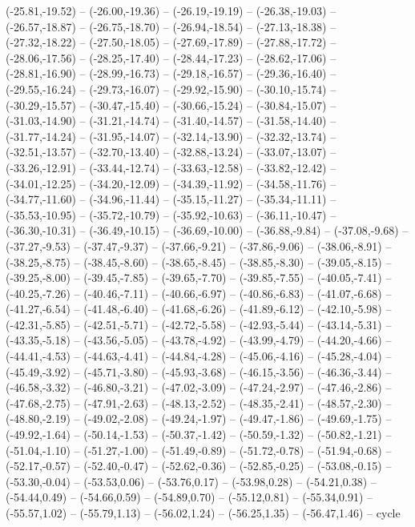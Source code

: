 {  (-25.81,-19.52) -- (-26.00,-19.36) -- (-26.19,-19.19) -- (-26.38,-19.03) -- (-26.57,-18.87) -- (-26.75,-18.70) -- (-26.94,-18.54) --
  (-27.13,-18.38) -- (-27.32,-18.22) -- (-27.50,-18.05) -- (-27.69,-17.89) -- (-27.88,-17.72) -- (-28.06,-17.56) -- (-28.25,-17.40) --
  (-28.44,-17.23) -- (-28.62,-17.06) -- (-28.81,-16.90) -- (-28.99,-16.73) -- (-29.18,-16.57) -- (-29.36,-16.40) -- (-29.55,-16.24) --
  (-29.73,-16.07) -- (-29.92,-15.90) -- (-30.10,-15.74) -- (-30.29,-15.57) -- (-30.47,-15.40) -- (-30.66,-15.24) -- (-30.84,-15.07) --
  (-31.03,-14.90) -- (-31.21,-14.74) -- (-31.40,-14.57) -- (-31.58,-14.40) -- (-31.77,-14.24) -- (-31.95,-14.07) -- (-32.14,-13.90) --
  (-32.32,-13.74) -- (-32.51,-13.57) -- (-32.70,-13.40) -- (-32.88,-13.24) -- (-33.07,-13.07) -- (-33.26,-12.91) -- (-33.44,-12.74) --
  (-33.63,-12.58) -- (-33.82,-12.42) -- (-34.01,-12.25) -- (-34.20,-12.09) -- (-34.39,-11.92) -- (-34.58,-11.76) -- (-34.77,-11.60) --
  (-34.96,-11.44) -- (-35.15,-11.27) -- (-35.34,-11.11) -- (-35.53,-10.95) -- (-35.72,-10.79) -- (-35.92,-10.63) -- (-36.11,-10.47) --
  (-36.30,-10.31) -- (-36.49,-10.15) -- (-36.69,-10.00) -- (-36.88,-9.84) -- (-37.08,-9.68) -- (-37.27,-9.53) -- (-37.47,-9.37) --
  (-37.66,-9.21) -- (-37.86,-9.06) -- (-38.06,-8.91) -- (-38.25,-8.75) -- (-38.45,-8.60) -- (-38.65,-8.45) -- (-38.85,-8.30) --
  (-39.05,-8.15) -- (-39.25,-8.00) -- (-39.45,-7.85) -- (-39.65,-7.70) -- (-39.85,-7.55) -- (-40.05,-7.41) -- (-40.25,-7.26) --
  (-40.46,-7.11) -- (-40.66,-6.97) -- (-40.86,-6.83) -- (-41.07,-6.68) -- (-41.27,-6.54) -- (-41.48,-6.40) -- (-41.68,-6.26) --
  (-41.89,-6.12) -- (-42.10,-5.98) -- (-42.31,-5.85) -- (-42.51,-5.71) -- (-42.72,-5.58) -- (-42.93,-5.44) -- (-43.14,-5.31) --
  (-43.35,-5.18) -- (-43.56,-5.05) -- (-43.78,-4.92) -- (-43.99,-4.79) -- (-44.20,-4.66) -- (-44.41,-4.53) -- (-44.63,-4.41) --
  (-44.84,-4.28) -- (-45.06,-4.16) -- (-45.28,-4.04) -- (-45.49,-3.92) -- (-45.71,-3.80) -- (-45.93,-3.68) -- (-46.15,-3.56) --
  (-46.36,-3.44) -- (-46.58,-3.32) -- (-46.80,-3.21) -- (-47.02,-3.09) -- (-47.24,-2.97) -- (-47.46,-2.86) -- (-47.68,-2.75) --
  (-47.91,-2.63) -- (-48.13,-2.52) -- (-48.35,-2.41) -- (-48.57,-2.30) -- (-48.80,-2.19) -- (-49.02,-2.08) -- (-49.24,-1.97) --
  (-49.47,-1.86) -- (-49.69,-1.75) -- (-49.92,-1.64) -- (-50.14,-1.53) -- (-50.37,-1.42) -- (-50.59,-1.32) -- (-50.82,-1.21) --
  (-51.04,-1.10) -- (-51.27,-1.00) -- (-51.49,-0.89) -- (-51.72,-0.78) -- (-51.94,-0.68) -- (-52.17,-0.57) -- (-52.40,-0.47) --
  (-52.62,-0.36) -- (-52.85,-0.25) -- (-53.08,-0.15) -- (-53.30,-0.04) -- (-53.53,0.06) -- (-53.76,0.17) -- (-53.98,0.28) --
  (-54.21,0.38) -- (-54.44,0.49) -- (-54.66,0.59) -- (-54.89,0.70) -- (-55.12,0.81) -- (-55.34,0.91) -- (-55.57,1.02) --
  (-55.79,1.13) -- (-56.02,1.24) -- (-56.25,1.35) -- (-56.47,1.46) -- cycle}
